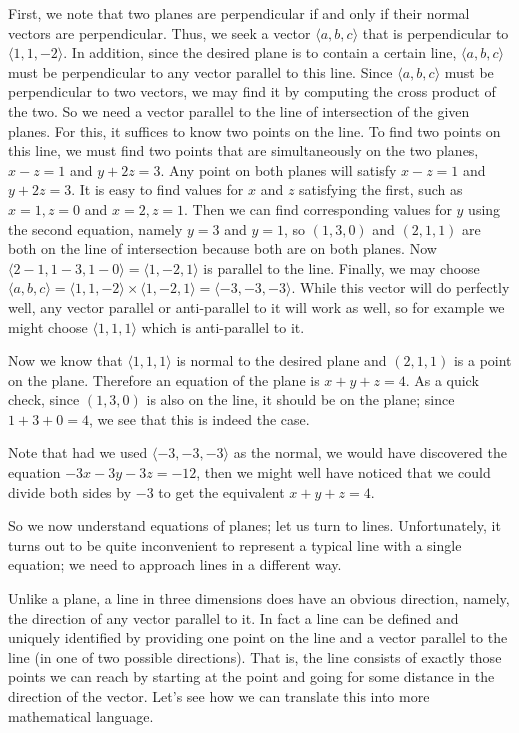 First, we note that two planes are perpendicular if and only if their
normal vectors are perpendicular. Thus, we seek a vector $\langle
a,b,c\rangle$ that is
perpendicular to $\langle 1,1,-2\rangle$. In addition, since the
desired plane is to contain a certain line, $\langle
a,b,c\rangle$ must be perpendicular to any vector parallel to this
line. Since $\langle
a,b,c\rangle$ must be perpendicular to two vectors, we may find it by
computing the cross product of the two. So we need a vector parallel
to the line of intersection of the given planes. For this, it suffices
to know two points on the line. To find two points on this line, we
must find two points that are simultaneously on the two planes, 
$x-z=1$ and $y+2z=3$. Any point on both planes will satisfy 
$x-z=1$ and $y+2z=3$. It is easy to find values for $x$ and $z$
satisfying the first, such as $x=1, z=0$ and $x=2, z=1$. Then
we can find corresponding values for $y$ using the second equation,
namely $y=3$ and $y=1$, so
$(1,3,0)$ and $(2,1,1)$ are both on the line
of intersection because both are on both planes. Now 
$\langle 2-1,1-3,1-0\rangle=\langle 1,-2,1\rangle$ is parallel to the
line. Finally, we may choose $\langle a,b,c\rangle=\langle
1,1,-2\rangle\times \langle 1,-2,1\rangle=\langle -3,-3,-3\rangle$.
While this vector will do perfectly well, any vector parallel or
anti-parallel to it will work as well, so for example we might choose
$\langle 1,1,1\rangle$ which is anti-parallel to it. 

Now we know that $\langle 1,1,1\rangle$ is normal to the desired plane
and $(2,1,1)$ is a point on the plane. Therefore an equation of the
plane is $x+y+z=4$. As a quick check, since $(1,3,0)$ is also on the
line, it should be on the plane; since $1+3+0=4$, we see that this is
indeed the case.

Note that had we used $\langle -3,-3,-3\rangle$ as the normal, we
would have discovered the equation $-3x-3y-3z=-12$, then we might well
have noticed that we could divide both sides by $-3$ to get the
equivalent $x+y+z=4$.
\endexample

So we now understand equations of planes; let us turn to
lines. Unfortunately, it turns out to be quite inconvenient to
represent a typical line with a single equation; we need to approach
lines in a different way.

Unlike a plane, a line in three dimensions does have an obvious
direction, namely, the direction of any vector parallel to it. In fact
a line can be defined and uniquely identified by providing one point
on the line and a vector parallel to the line (in one of two possible
directions). That is, the line consists of exactly those points we can
reach by starting at the point and going for some distance in the
direction of the vector. Let's see how we can translate this into more
mathematical language. 

